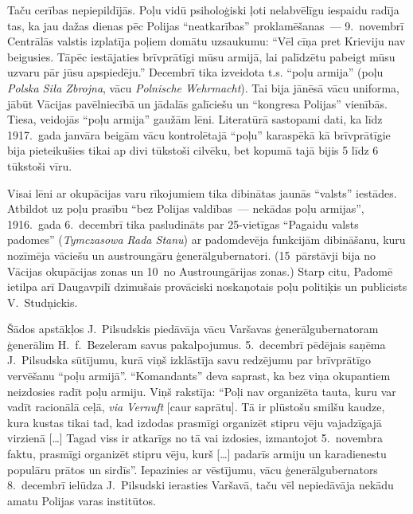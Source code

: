 \documentclass[twoside,a5paper,12pt,fleqn,openany]{extbook}
\newcommand{\pltxti}[1]{\textit{\textpolish{#1}}}
\newcommand{\detxti}[1]{\textit{\textgerman{#1}}}
\newcommand{\latxti}[1]{\textit{\textlatin{#1}}}
\newcommand{\citespace}{[\dots{}]}
\begin{document}
Taču cerības nepiepildījās. Poļu vidū psiholoģiski ļoti nelabvēlīgu iespaidu radīja tas, ka jau dažas dienas pēc Polijas ``neatkarības'' proklamēšanas~--- 9.~novembrī Centrālās valstis izplatīja poļiem domātu uzsaukumu: ``Vēl cīņa pret Krieviju nav beigusies. Tāpēc iestājaties brīvprātīgi mūsu armijā, lai palīdzētu pabeigt mūsu uzvaru pār jūsu apspiedēju.'' Decembrī tika izveidota t.s. ``poļu armija'' (poļu \pltxti{Polska Siła Zbrojna}, vācu \detxti{Polnische Wehrmacht}). Tai bija jānēsā vācu uniforma, jābūt Vācijas pavēlniecībā un jādalās galīciešu un ``kongresa Polijas'' vienībās. Tiesa, veidojās ``poļu armija'' gaužām lēni. Literatūrā sastopami dati, ka līdz 1917.~gada janvāra beigām vācu kontrolētajā ``poļu'' karaspēkā kā brīvprātīgie bija pieteikušies tikai ap divi tūkstoši cilvēku, bet kopumā tajā bijis 5 līdz 6 tūkstoši vīru.

Visai lēni ar okupācijas varu rīkojumiem tika dibinātas jaunās ``valsts'' iestādes. Atbildot uz poļu prasību ``bez Polijas valdības~--- nekādas poļu armijas'', 1916.~gada 6.~decembrī tika pasludināts par 25-vietīgas ``Pagaidu valsts padomes'' (\pltxti{Tymczasowa Rada Stanu}) ar padomdevēja funkcijām dibināšanu, kuru nozīmēja vāciešu un austroungāru ģenerālgubernatori. (15~pārstāvji bija no Vācijas okupācijas zonas un 10~no Austroungārijas zonas.) Starp citu, Padomē ietilpa arī Daugavpilī dzimušais provāciski noskaņotais poļu politiķis un publicists V.~Studņickis.

Šādos apstākļos J.~Pilsudskis piedāvāja vācu Varšavas ģenerālgubernatoram ģenerālim H.~f.~Bezeleram savus pakalpojumus. 5.~decembrī pēdējais saņēma J.~Pilsudska sūtījumu, kurā viņš izklāstīja savu redzējumu par brīvprātīgo vervēšanu ``poļu armijā''. ``Komandants'' deva saprast, ka bez viņa okupantiem neizdosies radīt poļu armiju. Viņš rakstīja: ``Poļi nav organizēta tauta, kuru var vadīt racionālā ceļā, \latxti{via Vernuft} [caur saprātu]. Tā ir plūstošu smilšu kaudze, kura kustas tikai tad, kad izdodas prasmīgi organizēt stipru vēju vajadzīgajā virzienā \citespace{} Tagad viss ir atkarīgs no tā vai izdosies, izmantojot 5.~novembra faktu, prasmīgi organizēt stipru vēju, kurš \citespace{} padarīs armiju un karadienestu populāru prātos un sirdīs''. Iepazinies ar vēstījumu, vācu ģenerālgubernators 8.~decembrī ielūdza J.~Pilsudski ierasties Varšavā, taču vēl nepiedāvāja nekādu amatu Polijas varas institūtos.
\end{document}
